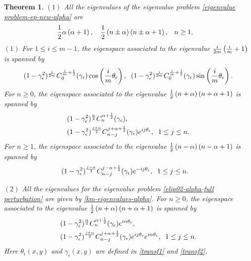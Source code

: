 \documentclass[1 [leqno, 11pt]{amsart}
\numberwithin{equation}{section}
\let\ep=\epsilon
\newtheorem{Theorem}{Theorem}[section]
\begin{document}
\begin{CJK*}{GBK}{song}
\begin{Theorem}
$(1)$
All the eigenvalues  of the eigenvalue problem \eqref{eigenvalue problem-ep-new-alpha} are
\begin{align}\label{km-eigenvalues-alpha}
{1\over2}\alpha\left(\alpha+1\right),\quad{1\over2}\left(n\pm\alpha\right)\left( n\pm\alpha+1\right), &\quad  n\geq1.
\end{align}
$(1)$ For $1\leq i\leq m-1$, the  eigenspace associated to the eigenvalue  ${i\over 2m}\left({i\over m}+1\right)$ is spanned by
 \begin{align*}
 (1-\gamma_\ep^2)^{i\over2m}C_0^{{i\over m}+{1\over2}}(\gamma_\ep)\cos\left({i\over m}\theta_\ep\right),\;\;(1-\gamma_\ep^2)^{i\over2m}C_0^{{i\over m}+{1\over2}}(\gamma_\ep)\sin\left({i\over m}\theta_\ep\right).
 \end{align*}
 \fi
 For  $n\geq0$,
the eigenspace associated to the eigenvalue  ${1\over2}\left(n+\alpha\right)\left( n+\alpha+1\right)$ is spanned by
\begin{align*}
&(1-\gamma_\ep^2)^{\alpha\over2}C_n^{\alpha+{1\over2}}(\gamma_\ep),\\
 &(1-\gamma_\ep^2)^{j+\alpha\over2}C_{n-j}^{{j+\alpha+{1\over2}}}(\gamma_\ep)e^{ij\theta_\ep},\;\;1\leq j\leq n.
 \end{align*}
 For  $n\geq1$,
the eigenspace associated to the eigenvalue  ${1\over2}\left(n-\alpha\right)\left( n-\alpha+1\right)$ is spanned by
\begin{align*}
 &(1-\gamma_\ep^2)^{j-\alpha\over2}C_{n-j}^{{j-\alpha+{1\over2}}}(\gamma_\ep)e^{-ij\theta_\ep},\;\;1\leq j\leq n.
 \end{align*}

$(2)$
All the eigenvalues  for the eigenvalue problem \eqref{elip02-alpha-full perturbation} are
given by \eqref{km-eigenvalues-alpha}.  For $n\geq0$,
the eigenspace associated to the eigenvalue  ${1\over2}\left(n+\alpha\right)\left( n+\alpha+1\right)$ is spanned by
\begin{align}\label{nonkm-eigenfunctions22}
&(1-\gamma_\ep^2)^{\alpha\over2}C_n^{\alpha+{1\over2}}(\gamma_\ep)e^{i\alpha\theta_\ep},\\\nonumber
 &(1-\gamma_\ep^2)^{j+\alpha\over2}C_{n-j}^{{j+\alpha+{1\over2}}}(\gamma_\ep)e^{ij\theta_\ep}e^{i\alpha\theta_\ep},\;\;1\leq j\leq n.
 \end{align}
Here $\theta_\ep(x,y)$ and  $\gamma_\ep(x,y)$ are defined in \eqref{transf1} and \eqref{transf2}.


\end{Theorem}
\end{CJK*}
\end{document}
